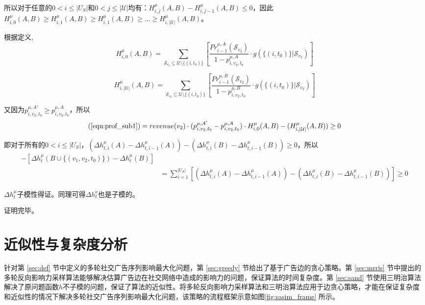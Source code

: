 所以对于任意的$0<i\le |U_S|$和$0<j\le |\mathcal{U}|$均有：$H_{i,j}^{\mu}(A,B)-H_{i,j-1}^{\mu}(A,B) \le 0$，因此$H_{i,0}^{\mu} (A,B)\ge H_{i,1}^{\mu}(A,B) \ge H_{i,1}^{\mu}(A,B) \ge \ldots \ge H_{i,|\mathcal{U}|}^{\mu}(A,B)$。

根据定义,
\begin{equation}
H_{i,0}^{\mu} (A,B)= \sum_{\mathcal{S}_{v_2}\subseteq \mathcal{U}\setminus \{(i,t_0)\}}\left[\frac{Pr_{i-1}^{\mu,A}(\mathcal{S}_{v_2})}{1-p_{i,v_2,t_0}^{\mu,A}} \cdot g(\{(i,t_0)\} |\mathcal{S}_{v_2})\right]
\end{equation}

\begin{equation}
H_{i,|\mathcal{U}|}^{\mu} (A,B)= \sum_{\mathcal{S}_{v_2}\subseteq \mathcal{U}\setminus \{(i,t_0)\}}\left[\frac{Pr_{i-1}^{\mu,B}(\mathcal{S}_{v_2})}{1-p_{i,v_2,t_0}^{\mu,B}} \cdot g(\{(i,t_0)\} |\mathcal{S}_{v_2})\right]
\end{equation}

又因为$p_{i,v_2,t_0}^{\mu,A'}\ge p_{i,v_2,t_0}^{\mu,A}$，所以
\begin{equation}
(\ref{equ:prof_sub1})=revenue(v_2)\cdot (p_{i,v_2,t_0}^{\mu,A'}-p_{i,v_2,t_0}^{\mu,A})\cdot H_{i,0}^{\mu}(A,B)-(H_{i,|\mathcal{U}|}^{\mu}(A,B)) \ge 0
\end{equation}

即对于所有的$0<i \le |U_S|$，$(\Delta h_{t,i}^{\mu}(A)-\Delta h_{t,i-1}^{\mu}(A)) - (\Delta h_{t,i}^{\mu}(B)-\Delta h_{t,i-1}^{\mu}(B)) \ge 0$，所以
\begin{align}
    [\Delta h_t^\mu(A \cup \{(v_1,v_2,t_0)\}&-\Delta h_t^\mu(A))]- [\Delta h_t^\mu(B\cup \{(v_1,v_2,t_0)\})-\Delta h_t^\mu(B)]\\ 
    &=\sum_{i=1}^{|U_S|}[(\Delta h_{t,i}^{\mu}(A)-\Delta h_{t,i-1}^{\mu}(A)) - (\Delta h_{t,i}^{\mu}(B)-\Delta h_{t,i-1}^{\mu}(B))] \ge 0
\end{align}

$\Delta h_t^\mu$子模性得证。同理可得$\Delta h_t^\nu$也是子模的。

\noindent 证明完毕。

\section{近似性与复杂度分析}
\label{sec:ana}

针对第 \ref{sec:def} 节中定义的多轮社交广告序列影响最大化问题，第 \ref{sec:greedy} 节给出了基于广告边的贪心策略。第 \ref{sec:mrris} 节中提出的多轮反向影响力采样算法能够解决估算广告边在社交网络中造成的影响力的问题，保证算法的时间复杂度。第 \ref{sec:sand} 节使用三明治算法解决了原问题函数$h$不子模的问题，保证了算法的近似性。将多轮反向影响力采样算法和三明治算法应用于边贪心策略，才能在保证复杂度和近似性的情况下解决多轮社交广告序列影响最大化问题，该策略的流程框架示意如图\ref{fig:sasim_frame} 所示。


